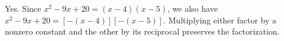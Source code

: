 Yes. Since $x^2-9x+20=(x-4)(x-5)$, we also have $x^2-9x+20=\boxed{[-(x-4)][-(x-5)]}$. Multiplying either factor by a nonzero constant and the other by its reciprocal preserves the factorization.
